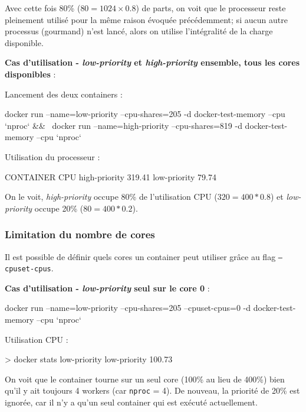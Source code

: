 \documentclass[11pt,a4paper,oneside]{report}
\newcommand{\code}[1]{\texttt{#1}}
\begin{document}
Avec cette fois 80\% ($80 = 1024 \times 0.8$) de parts, on voit que le processeur reste pleinement utilisé pour la même raison évoquée précédemment; si aucun autre processus (gourmand) n’est lancé, alors on utilise l'intégralité de la charge disponible.


\textbf{Cas d'utilisation - \textit{low-priority} et \textit{high-priority} ensemble, tous les cores disponibles} :

Lancement des deux containers :
\begin{bashcode}
docker run --name=low-priority  --cpu-shares=205 -d docker-test-memory --cpu `nproc` && \
docker run --name=high-priority --cpu-shares=819 -d docker-test-memory --cpu `nproc`
\end{bashcode}

Utilisation du processeur :
\begin{textcode}
CONTAINER      CPU %
high-priority  319.41%
low-priority   79.74%
\end{textcode}

On le voit, \textit{high-priority} occupe 80\% de l'utilisation CPU ($320 = 400 * 0.8$) et \textit{low-priority} occupe 20\% ($80 = 400 * 0.2$).


\subsubsection{Limitation du nombre de cores}
Il est possible de définir quels cores un container peut utiliser grâce au flag \code{--cpuset-cpus}.

\textbf{Cas d'utilisation - \textit{low-priority} seul sur le core 0} :

\begin{textcode}
docker run --name=low-priority --cpu-shares=205 --cpuset-cpus=0 -d docker-test-memory --cpu `nproc`
\end{textcode}

Utilisation CPU :
\begin{textcode}
> docker stats low-priority
low-priority   100.73%
\end{textcode}

On voit que le container tourne sur un seul core (100\% au lieu de 400\%) bien qu'il y ait toujours 4 workers (car \code{nproc} = 4). De nouveau, la priorité de 20\% est ignorée, car il n'y a qu'un seul container qui est exécuté actuellement.
\end{document}
